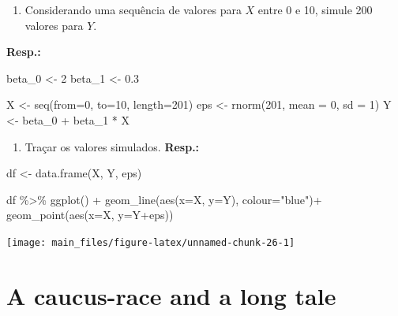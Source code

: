 \documentclass[
]{article}
\newenvironment{Shaded}{\begin{snugshade}}{\end{snugshade}}
\newcommand{\AttributeTok}[1]{\textcolor[rgb]{0.77,0.63,0.00}{#1}}
\newcommand{\DecValTok}[1]{\textcolor[rgb]{0.00,0.00,0.81}{#1}}
\newcommand{\FloatTok}[1]{\textcolor[rgb]{0.00,0.00,0.81}{#1}}
\newcommand{\FunctionTok}[1]{\textcolor[rgb]{0.00,0.00,0.00}{#1}}
\newcommand{\NormalTok}[1]{#1}
\newcommand{\OtherTok}[1]{\textcolor[rgb]{0.56,0.35,0.01}{#1}}
\newcommand{\SpecialCharTok}[1]{\textcolor[rgb]{0.00,0.00,0.00}{#1}}
\newcommand{\StringTok}[1]{\textcolor[rgb]{0.31,0.60,0.02}{#1}}
\providecommand{\tightlist}{%
  \setlength{\itemsep}{0pt}\setlength{\parskip}{0pt}}
\begin{document}
\begin{enumerate}
\def\labelenumi{\arabic{enumi}.}
\tightlist
\item
  Considerando uma sequência de valores para \(X\) entre 0 e 10, simule 200 valores para \(Y\).
\end{enumerate}

\textbf{Resp.:}

\begin{Shaded}
\begin{Highlighting}[]
\NormalTok{beta\_0 }\OtherTok{\textless{}{-}} \DecValTok{2}
\NormalTok{beta\_1 }\OtherTok{\textless{}{-}} \FloatTok{0.3}

\NormalTok{X }\OtherTok{\textless{}{-}} \FunctionTok{seq}\NormalTok{(}\AttributeTok{from=}\DecValTok{0}\NormalTok{, }\AttributeTok{to=}\DecValTok{10}\NormalTok{, }\AttributeTok{length=}\DecValTok{201}\NormalTok{)}
\NormalTok{eps }\OtherTok{\textless{}{-}} \FunctionTok{rnorm}\NormalTok{(}\DecValTok{201}\NormalTok{, }\AttributeTok{mean =} \DecValTok{0}\NormalTok{, }\AttributeTok{sd =} \DecValTok{1}\NormalTok{)}
\NormalTok{Y }\OtherTok{\textless{}{-}}\NormalTok{ beta\_0 }\SpecialCharTok{+}\NormalTok{ beta\_1 }\SpecialCharTok{*}\NormalTok{ X}
\end{Highlighting}
\end{Shaded}

\begin{enumerate}
\def\labelenumi{\arabic{enumi}.}
\setcounter{enumi}{1}
\tightlist
\item
  Traçar os valores simulados.
  \textbf{Resp.:}
\end{enumerate}

\begin{Shaded}
\begin{Highlighting}[]
\NormalTok{df }\OtherTok{\textless{}{-}} \FunctionTok{data.frame}\NormalTok{(X, Y, eps)}

\NormalTok{df }\SpecialCharTok{\%\textgreater{}\%}
  \FunctionTok{ggplot}\NormalTok{() }\SpecialCharTok{+}
    \FunctionTok{geom\_line}\NormalTok{(}\FunctionTok{aes}\NormalTok{(}\AttributeTok{x=}\NormalTok{X, }\AttributeTok{y=}\NormalTok{Y), }\AttributeTok{colour=}\StringTok{"blue"}\NormalTok{)}\SpecialCharTok{+}
    \FunctionTok{geom\_point}\NormalTok{(}\FunctionTok{aes}\NormalTok{(}\AttributeTok{x=}\NormalTok{X, }\AttributeTok{y=}\NormalTok{Y}\SpecialCharTok{+}\NormalTok{eps))}
\end{Highlighting}
\end{Shaded}

\texttt{[image: main\_files/figure-latex/unnamed-chunk-26-1]}

\hypertarget{a-caucus-race-and-a-long-tale}{%
\section{A caucus-race and a long tale}\label{a-caucus-race-and-a-long-tale}}
\end{document}
